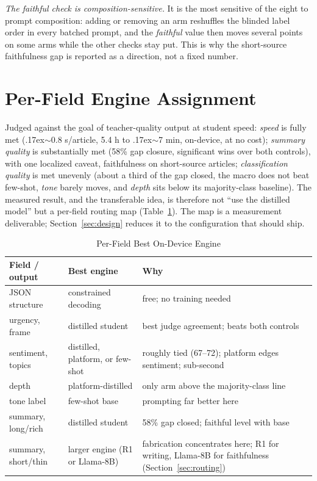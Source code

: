 \documentclass[10pt,journal]{IEEEtran}
\begin{document}
\emph{The faithful check is composition-sensitive.} It is the most sensitive of the eight to prompt composition: adding or removing an arm reshuffles the blinded label order in every batched prompt, and the \emph{faithful} value then moves several points on some arms while the other checks stay put. This is why the short-source faithfulness gap is reported as a direction, not a fixed number.

\section{Per-Field Engine Assignment}\label{sec:assignment}
Judged against the goal of teacher-quality output at student speed: \emph{speed} is fully met ({\raise.17ex\hbox{$\scriptstyle\sim$}}0.8 s/article, 5.4 h to {\raise.17ex\hbox{$\scriptstyle\sim$}}7 min, on-device, at no cost); \emph{summary quality} is substantially met (58\% gap closure, significant wins over both controls), with one localized caveat, faithfulness on short-source articles; \emph{classification quality} is met unevenly (about a third of the gap closed, the macro does not beat few-shot, \emph{tone} barely moves, and \emph{depth} sits below its majority-class baseline). The measured result, and the transferable idea, is therefore not ``use the distilled model'' but a per-field routing map (Table~\ref{tab:assignment}). The map is a measurement deliverable; Section~\ref{sec:design} reduces it to the configuration that should ship.

\begin{table}[t]
\centering
\caption{Per-Field Best On-Device Engine}
\label{tab:assignment}
\small
\begin{tabular}{@{}p{1.9cm}p{2.1cm}p{2.8cm}@{}}
\toprule
Field / output & Best engine & Why \\
\midrule
JSON structure & constrained decoding & free; no training needed \\
urgency, frame & distilled student & best judge agreement; beats both controls \\
sentiment, topics & distilled, platform, or few-shot & roughly tied (67--72); platform edges sentiment; sub-second \\
depth & platform-distilled & only arm above the majority-class line \\
tone label & few-shot base & prompting far better here \\
summary, long/rich & distilled student & 58\% gap closed; faithful level with base \\
summary, short/thin & larger engine (R1 or Llama-8B) & fabrication concentrates here; R1 for writing, Llama-8B for faithfulness (Section~\ref{sec:routing}) \\
\bottomrule
\end{tabular}
\end{table}
\end{document}
